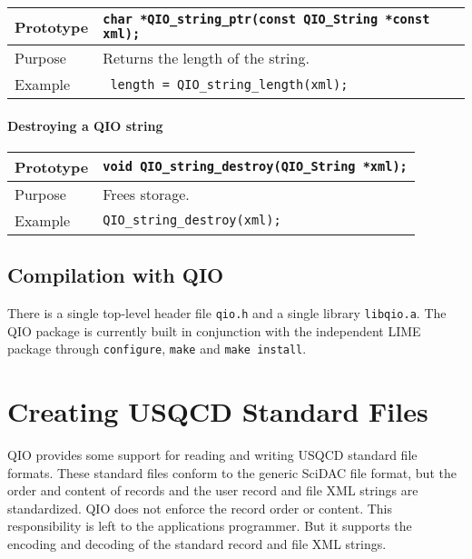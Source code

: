 \documentclass{article}
\newcommand{\QIOstring}{{\tt QIO\_String }}
\begin{document}
\begin{flushleft}
  \begin{tabular}{|l|l|}
  \hline
  Prototype      & \verb|char *QIO_string_ptr(const |\QIOstring \verb|*const xml);|\\
    \hline
  Purpose        & Returns the length of the string. \\
   \hline
  Example        & \verb| length = QIO_string_length(xml);| \\
   \hline
 \end{tabular}
\end{flushleft}
%
\paragraph{Destroying a QIO string}

\begin{flushleft}
  \begin{tabular}{|l|l|}
  \hline
  Prototype      & \verb|void QIO_string_destroy(|\QIOstring \verb|*xml);|\\
    \hline
  Purpose        & Frees storage. \\
   \hline
  Example        & \verb|QIO_string_destroy(xml);| \\
   \hline
 \end{tabular}
\end{flushleft}
%

\subsection{Compilation with QIO}

There is a single top-level header file \verb|qio.h| and a single
library \verb|libqio.a|.  The QIO package is currently built in
conjunction with the independent LIME package through
\verb|configure|, \verb|make| and \verb|make install|.

\appendix

\section{Creating USQCD Standard Files}

QIO provides some support for reading and writing USQCD standard file
formats.  These standard files conform to the generic SciDAC file
format, but the order and content of records and the user record and
file XML strings are standardized.  QIO does not enforce the record
order or content.  This responsibility is left to the applications
programmer.  But it supports the encoding and decoding of the standard
record and file XML strings.
\end{document}

